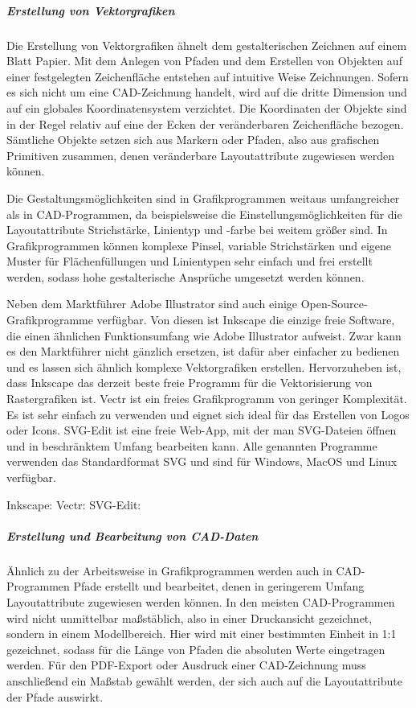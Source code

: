\subparagraph{Erstellung von Vektorgrafiken} 
Die Erstellung von Vektorgrafiken ähnelt dem gestalterischen Zeichnen auf einem Blatt Papier. Mit dem Anlegen von Pfaden und dem Erstellen von Objekten auf einer festgelegten Zeichenfläche entstehen auf intuitive Weise Zeichnungen. Sofern es sich nicht um eine CAD-Zeichnung handelt, wird auf die dritte Dimension und auf ein globales Koordinatensystem verzichtet. Die Koordinaten der Objekte sind in der Regel relativ auf eine der Ecken der veränderbaren Zeichenfläche bezogen. Sämtliche Objekte setzen sich aus Markern oder Pfaden, also aus grafischen Primitiven zusammen, denen veränderbare Layoutattribute zugewiesen werden können.

Die Gestaltungsmöglichkeiten sind in Grafikprogrammen weitaus umfangreicher als in CAD-Programmen, da beispielsweise die Einstellungsmöglichkeiten für die Layoutattribute Strichstärke, Linientyp und -farbe bei weitem größer sind. In Grafikprogrammen können komplexe Pinsel, variable Strichstärken und eigene Muster für Flächenfüllungen und Linientypen sehr einfach und frei erstellt werden, sodass hohe gestalterische Ansprüche umgesetzt werden können.

Neben dem Marktführer Adobe Illustrator sind auch einige Open-Source-Grafikprogramme verfügbar. Von diesen ist Inkscape die einzige freie Software, die einen ähnlichen Funktionsumfang wie Adobe Illustrator aufweist. Zwar kann es den Marktführer nicht gänzlich ersetzen, ist dafür aber einfacher zu bedienen und es lassen sich ähnlich komplexe Vektorgrafiken erstellen. Hervorzuheben ist, dass Inkscape das derzeit beste freie Programm für die Vektorisierung von Rastergrafiken ist. Vectr ist ein freies Grafikprogramm von geringer Komplexität. Es ist sehr einfach zu verwenden und eignet sich ideal für das Erstellen von Logos oder Icons. SVG-Edit ist eine freie Web-App, mit der man SVG-Dateien öffnen und in beschränktem Umfang bearbeiten kann. Alle genannten Programme verwenden das Standardformat SVG und sind für Windows, MacOS und Linux verfügbar.

\begin{flushleft}
	Inkscape: 
	Vectr: 
	SVG-Edit: 
\end{flushleft}

\subparagraph{Erstellung und Bearbeitung von CAD-Daten}
Ähnlich zu der Arbeitsweise in Grafikprogrammen werden auch in CAD-Programmen Pfade erstellt und bearbeitet, denen in geringerem Umfang Layoutattribute zugewiesen werden können. In den meisten CAD-Programmen wird nicht unmittelbar maßstäblich, also in einer Druckansicht gezeichnet, sondern in einem Modellbereich. Hier wird mit einer bestimmten Einheit in 1:1 gezeichnet, sodass für die Länge von Pfaden die absoluten Werte eingetragen werden. Für den PDF-Export oder Ausdruck einer CAD-Zeichnung muss anschließend ein Maßstab gewählt werden, der sich auch auf die Layoutattribute der Pfade auswirkt.

